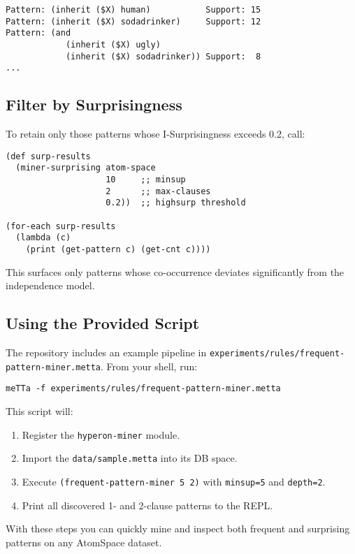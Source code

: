 \documentclass{article}
\begin{document}
\begin{verbatim}
Pattern: (inherit ($X) human)           Support: 15
Pattern: (inherit ($X) sodadrinker)     Support: 12
Pattern: (and
            (inherit ($X) ugly)
            (inherit ($X) sodadrinker)) Support:  8
...
\end{verbatim}

\subsection{Filter by Surprisingness}

To retain only those patterns whose I-Surprisingness exceeds 0.2, call:

\begin{verbatim}
(def surp-results
  (miner-surprising atom-space
                    10     ;; minsup
                    2      ;; max-clauses
                    0.2))  ;; highsurp threshold

(for-each surp-results
  (lambda (c)
    (print (get-pattern c) (get-cnt c))))
\end{verbatim}

This surfaces only patterns whose co-occurrence deviates significantly from the independence model.

\subsection{Using the Provided Script}

The repository includes an example pipeline in \texttt{experiments/rules/frequent-pattern-miner.metta}. From your shell, run:

\begin{verbatim}
meTTa -f experiments/rules/frequent-pattern-miner.metta
\end{verbatim}

This script will:
\begin{enumerate}
  \item Register the \texttt{hyperon-miner} module.
  \item Import the \texttt{data/sample.metta} into its DB space.
  \item Execute \texttt{(frequent-pattern-miner 5 2)} with \texttt{minsup=5} and \texttt{depth=2}.
  \item Print all discovered 1- and 2-clause patterns to the REPL.
\end{enumerate}

With these steps you can quickly mine and inspect both frequent and surprising patterns on any AtomSpace dataset.
\end{document}
